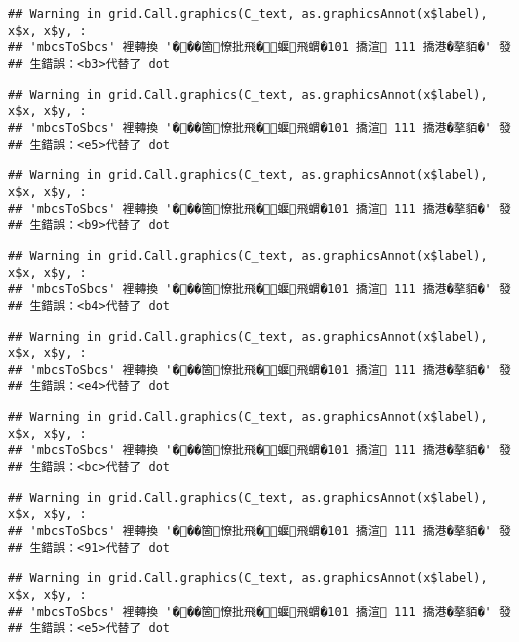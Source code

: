 \documentclass[
]{article}
\begin{document}
\begin{verbatim}
## Warning in grid.Call.graphics(C_text, as.graphicsAnnot(x$label), x$x, x$y, :
## 'mbcsToSbcs' 裡轉換 '���箇憭批飛�蝘飛蝟�101 撟渲 111 撟港�摮貊�' 發
## 生錯誤：<b3>代替了 dot
\end{verbatim}

\begin{verbatim}
## Warning in grid.Call.graphics(C_text, as.graphicsAnnot(x$label), x$x, x$y, :
## 'mbcsToSbcs' 裡轉換 '���箇憭批飛�蝘飛蝟�101 撟渲 111 撟港�摮貊�' 發
## 生錯誤：<e5>代替了 dot
\end{verbatim}

\begin{verbatim}
## Warning in grid.Call.graphics(C_text, as.graphicsAnnot(x$label), x$x, x$y, :
## 'mbcsToSbcs' 裡轉換 '���箇憭批飛�蝘飛蝟�101 撟渲 111 撟港�摮貊�' 發
## 生錯誤：<b9>代替了 dot
\end{verbatim}

\begin{verbatim}
## Warning in grid.Call.graphics(C_text, as.graphicsAnnot(x$label), x$x, x$y, :
## 'mbcsToSbcs' 裡轉換 '���箇憭批飛�蝘飛蝟�101 撟渲 111 撟港�摮貊�' 發
## 生錯誤：<b4>代替了 dot
\end{verbatim}

\begin{verbatim}
## Warning in grid.Call.graphics(C_text, as.graphicsAnnot(x$label), x$x, x$y, :
## 'mbcsToSbcs' 裡轉換 '���箇憭批飛�蝘飛蝟�101 撟渲 111 撟港�摮貊�' 發
## 生錯誤：<e4>代替了 dot
\end{verbatim}

\begin{verbatim}
## Warning in grid.Call.graphics(C_text, as.graphicsAnnot(x$label), x$x, x$y, :
## 'mbcsToSbcs' 裡轉換 '���箇憭批飛�蝘飛蝟�101 撟渲 111 撟港�摮貊�' 發
## 生錯誤：<bc>代替了 dot
\end{verbatim}

\begin{verbatim}
## Warning in grid.Call.graphics(C_text, as.graphicsAnnot(x$label), x$x, x$y, :
## 'mbcsToSbcs' 裡轉換 '���箇憭批飛�蝘飛蝟�101 撟渲 111 撟港�摮貊�' 發
## 生錯誤：<91>代替了 dot
\end{verbatim}

\begin{verbatim}
## Warning in grid.Call.graphics(C_text, as.graphicsAnnot(x$label), x$x, x$y, :
## 'mbcsToSbcs' 裡轉換 '���箇憭批飛�蝘飛蝟�101 撟渲 111 撟港�摮貊�' 發
## 生錯誤：<e5>代替了 dot
\end{verbatim}
\end{document}
